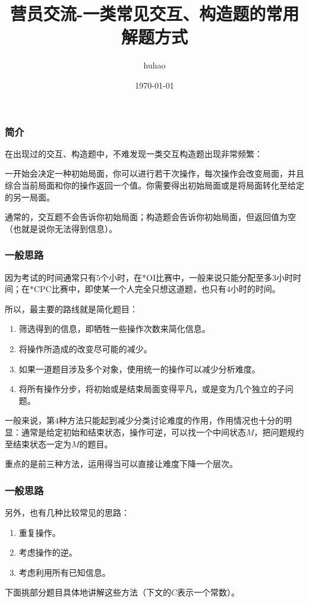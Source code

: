 \documentclass[10pt]{beamer}
\begin{document}
	\title{营员交流-一类常见交互、构造题的常用解题方式}
	\date{\today}
	\author{huhao}
	\maketitle
	\clearpage
	\begin{frame}
		\frametitle{简介}

		在出现过的交互、构造题中，不难发现一类交互构造题出现非常频繁：

		一开始会决定一种初始局面，你可以进行若干次操作，每次操作会改变局面，并且综合当前局面和你的操作返回一个值。你需要得出初始局面或是将局面转化至给定的另一局面。

		通常的，交互题不会告诉你初始局面；构造题会告诉你初始局面，但返回值为空（也就是说你无法得到信息）。
		
	\end{frame}
	\clearpage
	\begin{frame}
		\frametitle{一般思路}
	
		因为考试的时间通常只有$5$个小时，在*OI比赛中，一般来说只能分配至多$3$小时时间；在*CPC比赛中，即使某一个人完全只想这道题，也只有$4$小时的时间。

		所以，最主要的路线就是简化题目：

		\begin{enumerate}
			\item 筛选得到的信息，即牺牲一些操作次数来简化信息。
			\item 将操作所造成的改变尽可能的减少。
			\item 如果一道题目涉及多个对象，使用统一的操作可以减少分析难度。
			\item 将所有操作分步，将初始或是结束局面变得平凡，或是变为几个独立的子问题。
		\end{enumerate}

		一般来说，第$4$种方法只能起到减少分类讨论难度的作用，作用情况也十分的明显：通常是给定初始和结束状态，操作可逆，可以找一个中间状态$M$，把问题规约至结束状态一定为$M$的题目。
		
		重点的是前三种方法，运用得当可以直接让难度下降一个层次。
	\end{frame}
	\clearpage
	\begin{frame}
		\frametitle{一般思路}
	
		另外，也有几种比较常见的思路：

		\begin{enumerate}
			\item 重复操作。
			\item 考虑操作的逆。
			\item 考虑利用所有已知信息。
		\end{enumerate}

		下面挑部分题目具体地讲解这些方法（下文的$C$表示一个常数）。
	
	\end{frame}
\end{document}
